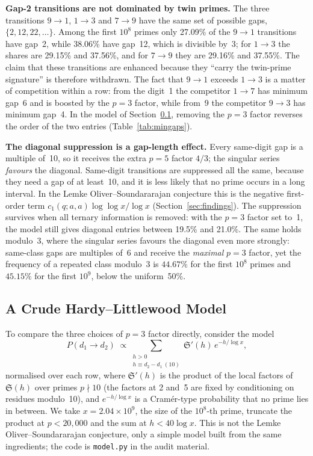 \documentclass[12pt,a4paper]{article}
\theoremstyle{plain}
\theoremstyle{definition}
\theoremstyle{remark}
\begin{document}
\medskip
\noindent\textbf{Gap-2 transitions are not dominated by twin primes.} The three
transitions $9 \to 1$, $1 \to 3$ and $7 \to 9$ have the same set of possible gaps,
$\{2, 12, 22, \ldots\}$. Among the first $10^8$ primes only 27.09\% of the $9 \to 1$
transitions have gap~2, while 38.06\% have gap~12, which is divisible by~3; for
$1 \to 3$ the shares are 29.15\% and 37.56\%, and for $7 \to 9$ they are 29.16\% and
37.55\%. The claim that these transitions are enhanced because they ``carry the
twin-prime signature'' is therefore withdrawn. The fact that $9 \to 1$ exceeds $1 \to 3$
is a matter of competition within a row: from the digit~1 the competitor $1 \to 7$ has
minimum gap~6 and is boosted by the $p = 3$ factor, while from~9 the competitor
$9 \to 3$ has minimum gap~4. In the model of Section~\ref{sec:model}, removing the
$p = 3$ factor reverses the order of the two entries (Table~\ref{tab:mingaps}).

\medskip
\noindent\textbf{The diagonal suppression is a gap-length effect.} Every same-digit gap
is a multiple of~10, so it receives the extra $p = 5$ factor $4/3$; the singular series
\emph{favours} the diagonal. Same-digit transitions are suppressed all the same,
because they need a gap of at least~10, and it is less likely that no prime occurs in a
long interval. In the Lemke Oliver--Soundararajan conjecture this is the negative
first-order term $c_1(q;a,a)\log\log x/\log x$ (Section~\ref{sec:findings}). The
suppression survives when all ternary information is removed: with the $p=3$ factor
set to~1, the model still gives diagonal entries between 19.5\% and 21.0\%.
The same holds modulo~3, where the singular series favours the diagonal even more
strongly: same-class gaps are multiples of~6 and receive the \emph{maximal} $p = 3$
factor, yet the frequency of a repeated class
modulo~3 is $44.67\%$ for the first $10^8$ primes and $45.15\%$ for the first $10^9$,
below the uniform~50\%.

\subsection{A Crude Hardy--Littlewood Model}
\label{sec:model}

To compare the three choices of $p = 3$ factor directly, consider the model
\[
  P(d_1 \to d_2) \;\propto \sum_{\substack{h > 0 \\ h \equiv d_2 - d_1 \ (10)}}
  \mathfrak{S}'(h)\, e^{-h/\log x},
\]
normalised over each row, where $\mathfrak{S}'(h)$ is the product of the local factors
of $\mathfrak{S}(h)$ over primes $p \nmid 10$ (the factors at 2 and~5 are fixed by
conditioning on residues modulo~10), and $e^{-h/\log x}$ is a Cram\'er-type
probability that no prime lies in between. We take $x = 2.04 \times 10^9$, the size of
the $10^8$-th prime, truncate the product at $p < 20{,}000$ and the sum at
$h < 40\log x$. This is not the Lemke Oliver--Soundararajan conjecture, only a simple
model built from the same ingredients; the code is \texttt{model.py} in the audit
material.
\end{document}
